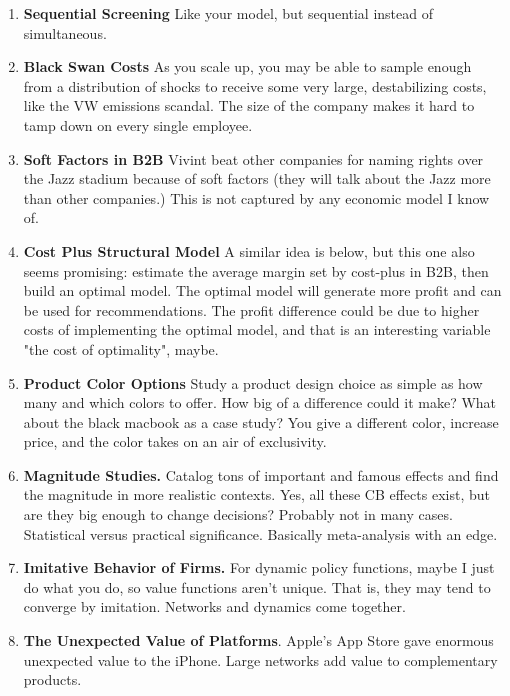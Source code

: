 \documentclass[paper=a4, fontsize=11pt]{scrartcl} %
\numberwithin{equation}{section} %
\numberwithin{figure}{section} %
\numberwithin{table}{section} %
\begin{document}
\begin{enumerate}

\item \textbf{Sequential Screening} Like your model, but sequential instead of simultaneous.

\item \textbf{Black Swan Costs} As you scale up, you may be able to sample enough from a distribution of shocks to receive some very large, destabilizing costs, like the VW emissions scandal.  The size of the company makes it hard to tamp down on every single employee.

\item \textbf{Soft Factors in B2B} Vivint beat other companies for naming rights over the Jazz stadium because of soft factors (they will talk about the Jazz more than other companies.)  This is not captured by any economic model I know of.

\item \textbf{Cost Plus Structural Model} A similar idea is below, but this one also seems promising: estimate the average margin set by cost-plus in B2B, then build an optimal model.  The optimal model will generate more profit and can be used for recommendations.  The profit difference could be due to higher costs of implementing the optimal model, and that is an interesting variable "the cost of optimality", maybe.

\item \textbf{Product Color Options} Study a product design choice as simple as how many and which colors to offer.  How big of a difference could it make?  What about the black macbook as a case study?  You give a different color, increase price, and the color takes on an air of exclusivity.  

\item \textbf{Magnitude Studies.}  Catalog tons of important and famous effects and find the magnitude in more realistic contexts.  Yes, all these CB effects exist, but are they big enough to change decisions?  Probably not in many cases. Statistical versus practical significance.   Basically meta-analysis with an edge.

\item \textbf{Imitative Behavior of Firms.}  For dynamic policy functions, maybe I just do what you do, so value functions aren't unique.  That is, they may tend to converge by imitation.  Networks and dynamics come together.  

\item \textbf{The Unexpected Value of Platforms}.  Apple's App Store gave enormous unexpected value to the iPhone.  Large networks add value to complementary products.


\end{enumerate}
\end{document}
